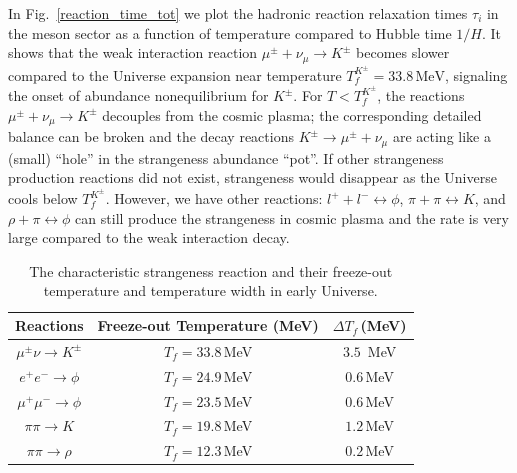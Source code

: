 In Fig.~\ref{reaction_time_tot} we plot the  hadronic reaction relaxation times $\tau_{i}$ in the meson sector as a function of temperature compared to Hubble time $1/H$.
It shows that the weak interaction reaction $\mu^\pm+\nu_{\mu}\rightarrow K^\pm$ becomes slower compared to the Universe expansion near temperature $T_f^{K^\pm}=33.8\,\mathrm{MeV}$, signaling the onset of abundance nonequilibrium for $K^\pm$. For $T<T_f^{K^\pm}$, the reactions $\mu^\pm+\nu_{\mu}\rightarrow K^\pm$ decouples from the cosmic plasma; the corresponding detailed balance can be broken and the decay reactions $K^\pm\rightarrow\mu^\pm+\nu_{\mu}$ are acting like a (small) ``hole'' in the strangeness abundance ``pot''. If other strangeness production reactions did not exist, strangeness would disappear as the Universe cools below $T_f^{K^\pm}$. However, we have other reactions: $l^++l^-\leftrightarrow\phi$, $\pi+\pi\leftrightarrow K$, and $\rho+\pi\leftrightarrow\phi$ can still produce the strangeness in cosmic plasma and the rate is very large compared to the weak interaction decay.
\begin{table}%
\centering
\begin{tabular}{c| c| c}
\hline\hline
Reactions &Freeze-out Temperature (MeV) & {$\Delta T_f$\,(MeV)} \\
\hline
$\mu^\pm\nu\rightarrow K^\pm$ & $T_f=33.8$\,MeV & {$3.5$ \,MeV}\\ 
\hline
$e^+e^-\rightarrow \phi$ & $T_f=24.9$\,MeV &{$0.6$\,MeV}\\
$\mu^+\mu^-\rightarrow\phi$ & $T_f=23.5$\,MeV &{$0.6$\,MeV}\\
\hline
 $\pi\pi\rightarrow K$ & $T_f=19.8$\,MeV&{$1.2$\,MeV}\\
\hline
$\pi\pi\rightarrow\rho$ & $T_f=12.3$\,MeV&{$0.2$\,MeV}\\
\hline\hline
\end{tabular}
\caption{The characteristic strangeness reaction and their freeze-out temperature and temperature width in early Universe.}
\label{FreezeoutTemperature_table} 
\end{table}


